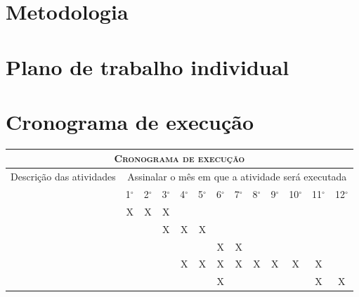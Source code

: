 \documentclass[portuguese, a4paper, 12pt, draft]{article}
\begin{document}
\section{Metodologia}


\section{Plano de trabalho individual}

\section{Cronograma de execução}

\begin{center}
  \begin{tabularx}{0.98\textwidth}{|X||c|c|c|c|c|c|c|c|c|c|c|c|}
\hline
\multicolumn{13}{|c|}{\textsc{Cronograma de execução}} \\ \hline
Descrição das atividades &
\multicolumn{12}{|c|}{Assinalar o mês em que a atividade será executada} \\ \hline
 & 1$^\circ$ & 2$^\circ$ & 3$^\circ$ & 4$^\circ$ & 5$^\circ$ & 6$^\circ$ &
 7$^\circ$ & 8$^\circ$ & 9$^\circ$ & 10$^\circ$ & 11$^\circ$ & 12$^\circ$ \\ \hline
       &X&X&X& & & & & & & & & \\ \hline
       & & &X&X&X& & & & & & & \\ \hline
       & & & & & &X&X& & & & & \\ \hline
       & & & &X&X&X&X&X&X&X&X& \\ \hline
       & & & & & &X& & & & &X&X\\ \hline
\end{tabularx}
\end{center}



\end{document}
